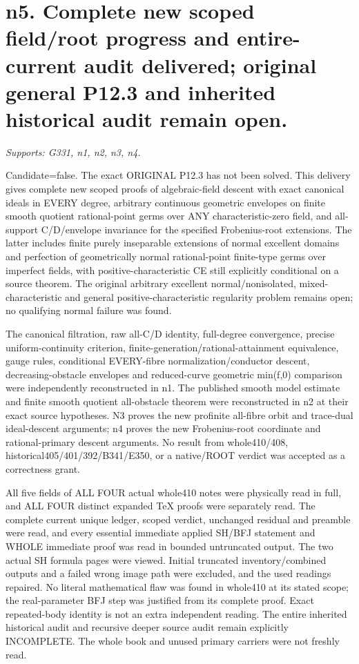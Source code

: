 \section{n5. Complete new scoped field/root progress and entire-current audit delivered; original general P12.3 and inherited historical audit remain open.}
\textit{Supports: G331, n1, n2, n3, n4.}

Candidate=false. The exact ORIGINAL P12.3 has not been solved. This delivery gives complete new scoped proofs of algebraic-field descent with exact canonical ideals in EVERY degree, arbitrary continuous geometric envelopes on finite smooth quotient rational-point germs over ANY characteristic-zero field, and all-support C/D/envelope invariance for the specified Frobenius-root extensions. The latter includes finite purely inseparable extensions of normal excellent domains and perfection of geometrically normal rational-point finite-type germs over imperfect fields, with positive-characteristic CE still explicitly conditional on a source theorem. The original arbitrary excellent normal/nonisolated, mixed-characteristic and general positive-characteristic regularity problem remains open; no qualifying normal failure was found.

The canonical filtration, raw all-C/D identity, full-degree convergence, precise uniform-continuity criterion, finite-generation/rational-attainment equivalence, gauge rules, conditional EVERY-fibre normalization/conductor descent, decreasing-obstacle envelopes and reduced-curve geometric min(f,0) comparison were independently reconstructed in n1. The published smooth model estimate and finite smooth quotient all-obstacle theorem were reconstructed in n2 at their exact source hypotheses. N3 proves the new profinite all-fibre orbit and trace-dual ideal-descent arguments; n4 proves the new Frobenius-root coordinate and rational-primary descent arguments. No result from whole410/408, historical405/401/392/B341/E350, or a native/ROOT verdict was accepted as a correctness grant.

All five fields of ALL FOUR actual whole410 notes were physically read in full, and ALL FOUR distinct expanded TeX proofs were separately read. The complete current unique ledger, scoped verdict, unchanged residual and preamble were read, and every essential immediate applied SH/BFJ statement and WHOLE immediate proof was read in bounded untruncated output. The two actual SH formula pages were viewed. Initial truncated inventory/combined outputs and a failed wrong image path were excluded, and the used readings repaired. No literal mathematical flaw was found in whole410 at its stated scope; the real-parameter BFJ step was justified from its complete proof. Exact repeated-body identity is not an extra independent reading. The entire inherited historical audit and recursive deeper source audit remain explicitly INCOMPLETE. The whole book and unused primary carriers were not freshly read.

